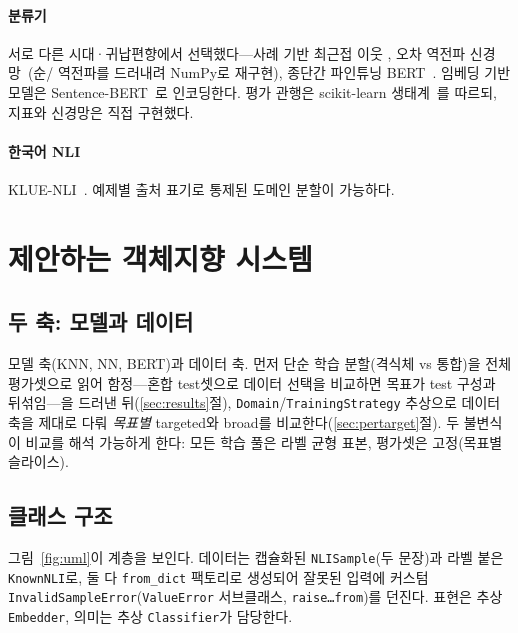 \documentclass[conference]{IEEEtran}
\begin{document}
\paragraph*{분류기}
서로 다른 시대·귀납편향에서 선택했다---사례 기반 최근접 이웃
\cite{cover1967nearest}, 오차 역전파 신경망~\cite{rumelhart1986learning}(순/
역전파를 드러내려 NumPy로 재구현), 종단간 파인튜닝 BERT~\cite{devlin2019bert}.
임베딩 기반 모델은 Sentence-BERT~\cite{reimers2019sentence}로 인코딩한다.
평가 관행은 scikit-learn 생태계~\cite{pedregosa2011scikit}를 따르되, 지표와
신경망은 직접 구현했다.

\paragraph*{한국어 NLI}
KLUE-NLI~\cite{park2021klue}. 예제별 출처 표기로 통제된 도메인 분할이 가능하다.

\section{제안하는 객체지향 시스템}
\label{sec:system}

\subsection{두 축: 모델과 데이터}
모델 축(KNN, NN, BERT)과 데이터 축. 먼저 단순 학습 분할(격식체 vs 통합)을
전체 평가셋으로 읽어 함정---혼합 test셋으로 데이터 선택을 비교하면 목표가
test 구성과 뒤섞임---을 드러낸 뒤(\ref{sec:results}절),
\texttt{Domain}/\texttt{TrainingStrategy} 추상으로 데이터 축을 제대로 다뤄
\emph{목표별} targeted와 broad를 비교한다(\ref{sec:pertarget}절). 두 불변식이
비교를 해석 가능하게 한다: 모든 학습 풀은 라벨 균형 표본, 평가셋은 고정(목표별
슬라이스).

\subsection{클래스 구조}
그림~\ref{fig:uml}이 계층을 보인다. 데이터는 캡슐화된 \texttt{NLISample}(두
문장)과 라벨 붙은 \texttt{KnownNLI}로, 둘 다 \texttt{from\_dict} 팩토리로
생성되어 잘못된 입력에 커스텀 \texttt{InvalidSampleError}(\texttt{ValueError}
서브클래스, \texttt{raise\ldots from})를 던진다. 표현은 추상 \texttt{Embedder},
의미는 추상 \texttt{Classifier}가 담당한다.
\end{document}
